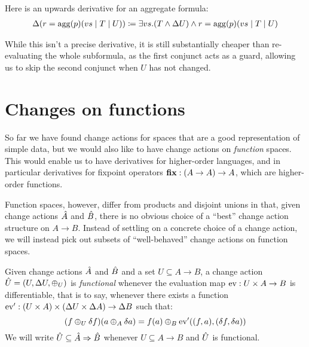 Here is an upwards derivative for an aggregate formula:
\begin{align*}
  \Delta(r = \mathrm{agg}(p)(vs \mid T \mid U)) \coloneqq \exists vs. (T \wedge \Delta{U}) \wedge r = \mathrm{agg}(p)(vs \mid T \mid U)
\end{align*}

While this isn't a precise derivative, it is still substantially cheaper than
re-evaluating the whole subformula, as the first conjunct acts as a guard,
allowing us to skip the second conjunct when $U$ has not changed.

%

\section{Changes on functions}

So far we have found change actions for spaces that are a good representation of
simple data, but we would also like to have change actions on
\emph{function} spaces. This would enable us to have derivatives for higher-order languages, and in particular derivatives for
fixpoint operators $\mathbf{fix} : (A \rightarrow A) \rightarrow A$, which are higher-order functions. 

Function spaces, however, differ from products and disjoint unions in that, given change actions $\hat{A}$ and $\hat{B}$, there is no obvious choice
of a ``best'' change action structure on $A \rightarrow B$.
Instead of settling on a concrete choice of a change action, we will instead
pick out subsets of ``well-behaved'' change actions on function spaces.

\begin{defn}
  \label{def:functionalChanges}
  Given change actions $\hat{A}$ and $\hat{B}$ and a set $U \subseteq A \rightarrow B$, a change action
  $\hat{U} = (U, \Delta U, \oplus_U)$ is \emph{functional} whenever the evaluation map $\operatorname{ev} : U \times A \rightarrow B$
  is differentiable, that is to say, whenever there exists a function 
  $\operatorname{ev}' : (U \times A) \times (\Delta U \times \Delta A) \rightarrow \Delta B$ such that:
  \begin{displaymath}
    (f \oplus_U \delta f)(a \oplus_A \delta a) = 
    f(a) \oplus_B \operatorname{ev}'((f, a), (\delta f, \delta a))
  \end{displaymath}
  We will write $\hat{U} \subseteq \hat{A} \Rightarrow \hat{B}$ whenever 
  $U \subseteq A \rightarrow B$ and $\hat{U}$ is functional.
\end{defn}

